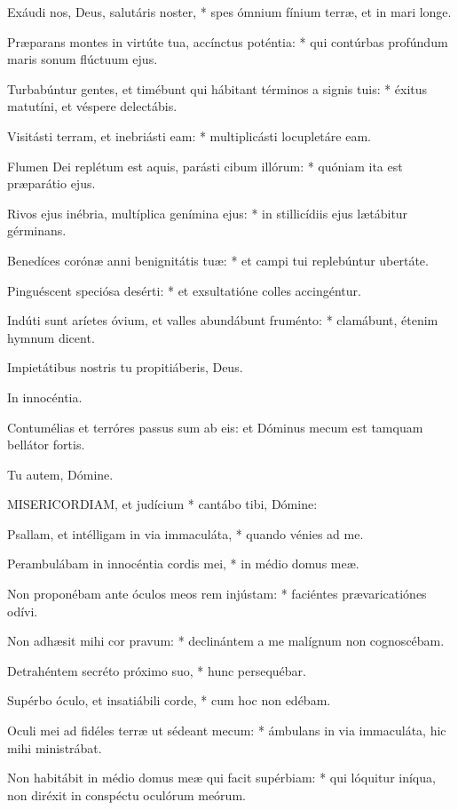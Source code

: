 Exáudi nos, Deus, salutáris noster, * spes ómnium fínium terræ, et in mari longe.

Præparans montes in virtúte tua, accínctus poténtia: * qui contúrbas profúndum maris sonum flúctuum ejus.

Turbabúntur gentes, et timébunt qui hábitant términos a signis tuis: * éxitus matutíni, et véspere delectábis.

Visitásti terram, et inebriásti eam: * multiplicásti locupletáre eam.

Flumen Dei replétum est aquis, parásti cibum illórum: * quóniam ita est præparátio ejus.

Rivos ejus inébria, multíplica genímina ejus: * in stillicídiis ejus lætábitur gérminans.

Benedíces corónæ anni benignitátis tuæ: * et campi tui replebúntur ubertáte.

Pinguéscent speciósa desérti: * et exsultatióne colles accingéntur.

Indúti sunt aríetes óvium, et valles abundábunt fruménto: * clamábunt, étenim hymnum dicent.

 Impietátibus nostris tu propitiáberis, Deus.

 In innocéntia.


 Contumélias et terróres passus sum ab eis: et Dóminus mecum est tamquam bellátor fortis.

 Tu autem, Dómine.


\lettrine[lines=2]{M}{ISERICORDIAM}, et judícium * cantábo tibi, Dómine:

Psallam, et intélligam in via immaculáta, * quando vénies ad me.

Perambulábam in innocéntia cordis mei, * in médio domus meæ.

Non proponébam ante óculos meos rem injústam: * faciéntes prævaricatiónes odívi.

Non adhæsit mihi cor pravum: * declinántem a me malígnum non cognoscébam.

Detrahéntem secréto próximo suo, * hunc persequébar.

Supérbo óculo, et insatiábili corde, * cum hoc non edébam.

Oculi mei ad fidéles terræ ut sédeant mecum: * ámbulans in via immaculáta, hic mihi ministrábat.

Non habitábit in médio domus meæ qui facit supérbiam: * qui lóquitur iníqua, non diréxit in conspéctu oculórum meórum.

